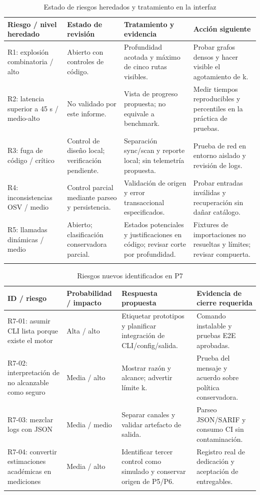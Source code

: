 \begin{table}[H]
\centering\small{}
\caption{Estado de riesgos heredados y tratamiento en la interfaz}
\begin{tabularx}{\textwidth}{P{3.2cm}P{2.5cm}YY}
\toprule
\textbf{Riesgo / nivel heredado} & \textbf{Estado de revisión} & \textbf{Tratamiento y evidencia} & \textbf{Acción siguiente} \\
\midrule
R1: explosión combinatoria / alto & Abierto con controles de código. & Profundidad acotada y máximo de cinco rutas visibles. & Probar grafos densos y hacer visible el agotamiento de k. \\
\addlinespace
R2: latencia superior a 45 s / medio-alto & No validado por este informe. & Vista de progreso propuesta; no equivale a benchmark. & Medir tiempos reproducibles y percentiles en la práctica de pruebas. \\
\addlinespace
R3: fuga de código / crítico & Control de diseño local; verificación pendiente. & Separación sync/scan y reporte local; sin telemetría propuesta. & Prueba de red en entorno aislado y revisión de logs. \\
\addlinespace
R4: inconsistencias OSV / medio & Control parcial mediante parseo y persistencia. & Validación de origen y error transaccional especificados. & Probar entradas inválidas y recuperación sin dañar catálogo. \\
\addlinespace
R5: llamadas dinámicas / medio & Abierto; clasificación conservadora parcial. & Estados potenciales y justificaciones en código; revisar corte por profundidad. & Fixtures de importaciones no resueltas y límites; revisar compuerta. \\
\addlinespace
\bottomrule
\end{tabularx}
\end{table}


\begin{table}[H]
\centering\small{}
\caption{Riesgos nuevos identificados en P7}
\begin{tabularx}{\textwidth}{P{3.5cm}P{2.5cm}YY}
\toprule
\textbf{ID / riesgo} & \textbf{Probabilidad / impacto} & \textbf{Respuesta propuesta} & \textbf{Evidencia de cierre requerida} \\
\midrule
R7-01: asumir CLI lista porque existe el motor & Alta / alto & Etiquetar prototipos y planificar integración de CLI/config/salida. & Comando instalable y pruebas E2E aprobadas. \\
\addlinespace
R7-02: interpretación de no alcanzable como seguro & Media / alto & Mostrar razón y alcance; advertir límite k. & Prueba del mensaje y acuerdo sobre política conservadora. \\
\addlinespace
R7-03: mezclar logs con JSON & Media / medio & Separar canales y validar artefacto de salida. & Parseo JSON/SARIF y consumo CI sin contaminación. \\
\addlinespace
R7-04: convertir estimaciones académicas en mediciones & Media / alto & Identificar tercer control como simulado y conservar origen de P5/P6. & Registro real de dedicación y aceptación de entregables. \\
\addlinespace
\bottomrule
\end{tabularx}
\end{table}


